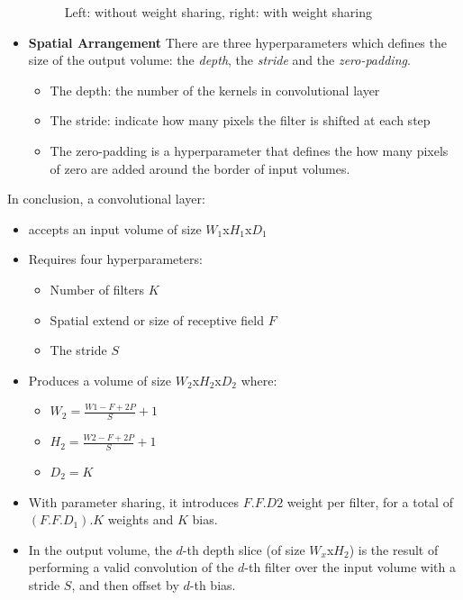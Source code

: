 \begin{itemize}
\begin{figure}[h!]
        \caption{Left: without weight sharing, right: with weight sharing}
        \label{fig:param_share}
    \end{figure}
    \item \textbf{Spatial Arrangement} There are three hyperparameters which defines the size of the output volume: the \textit{depth}, the \textit{stride} and the \textit{zero-padding}.
    \begin{itemize}
        \item The depth: the number of the kernels in convolutional layer
        \item The stride: indicate how many pixels the filter is shifted at each step
        \item The zero-padding is a hyperparameter that defines the how many pixels of zero are added around the border of input volumes.
    \end{itemize}
\end{itemize}
In conclusion, a convolutional layer:
\begin{itemize}
    \item accepts an input volume of size $W_1$x$H_1$x$D_1$
    \item Requires four hyperparameters:
    \begin{itemize}
        \item Number of filters $K$
        \item Spatial extend or size of receptive field $F$
        \item The stride $S$
    \end{itemize}
    \item Produces a volume of size $W_2$x$H_2$x$D_2$ where:
    \begin{itemize}
        \item $W_2 = \frac{W1-F + 2P}{S} + 1$
        \item $H_2 = \frac{W2-F + 2P}{S} + 1$
        \item $D_2=K$
    \end{itemize}
    \item With parameter sharing, it introduces $F.F.D2$ weight per filter, for a total of $(F.F.D_1).K$ weights and $K$ bias.
    \item In the output volume, the $d$-th depth slice (of size $W_x$x$H_2$) is the result of performing a valid convolution of the $d$-th filter over the input volume with a stride $S$, and then offset by $d$-th bias.
\end{itemize}
